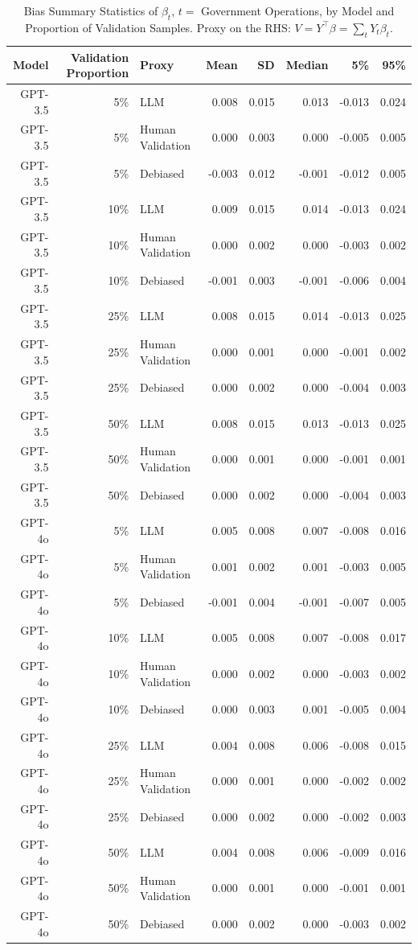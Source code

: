 \begin{table}

\caption{Bias Summary Statistics of $\beta_{t}$, $t=$ Government Operations, by Model and Proportion of Validation Samples.
      Proxy on the RHS: $V = Y^\top \beta = \sum_{t} Y_t \beta_t$.}
\centering
\begin{tabular}[t]{rrlrrrrr}
\toprule
Model & Validation Proportion & Proxy & Mean & SD & Median & 5\% & 95\%\\
\midrule
GPT-3.5 & 5\% & LLM & 0.008 & 0.015 & 0.013 & -0.013 & 0.024\\
GPT-3.5 & 5\% & Human Validation & 0.000 & 0.003 & 0.000 & -0.005 & 0.005\\
GPT-3.5 & 5\% & Debiased & -0.003 & 0.012 & -0.001 & -0.012 & 0.005\\
GPT-3.5 & 10\% & LLM & 0.009 & 0.015 & 0.014 & -0.013 & 0.024\\
GPT-3.5 & 10\% & Human Validation & 0.000 & 0.002 & 0.000 & -0.003 & 0.002\\
GPT-3.5 & 10\% & Debiased & -0.001 & 0.003 & -0.001 & -0.006 & 0.004\\
GPT-3.5 & 25\% & LLM & 0.008 & 0.015 & 0.014 & -0.013 & 0.025\\
GPT-3.5 & 25\% & Human Validation & 0.000 & 0.001 & 0.000 & -0.001 & 0.002\\
GPT-3.5 & 25\% & Debiased & 0.000 & 0.002 & 0.000 & -0.004 & 0.003\\
GPT-3.5 & 50\% & LLM & 0.008 & 0.015 & 0.013 & -0.013 & 0.025\\
GPT-3.5 & 50\% & Human Validation & 0.000 & 0.001 & 0.000 & -0.001 & 0.001\\
GPT-3.5 & 50\% & Debiased & 0.000 & 0.002 & 0.000 & -0.004 & 0.003\\
GPT-4o & 5\% & LLM & 0.005 & 0.008 & 0.007 & -0.008 & 0.016\\
GPT-4o & 5\% & Human Validation & 0.001 & 0.002 & 0.001 & -0.003 & 0.005\\
GPT-4o & 5\% & Debiased & -0.001 & 0.004 & -0.001 & -0.007 & 0.005\\
GPT-4o & 10\% & LLM & 0.005 & 0.008 & 0.007 & -0.008 & 0.017\\
GPT-4o & 10\% & Human Validation & 0.000 & 0.002 & 0.000 & -0.003 & 0.002\\
GPT-4o & 10\% & Debiased & 0.000 & 0.003 & 0.001 & -0.005 & 0.004\\
GPT-4o & 25\% & LLM & 0.004 & 0.008 & 0.006 & -0.008 & 0.015\\
GPT-4o & 25\% & Human Validation & 0.000 & 0.001 & 0.000 & -0.002 & 0.002\\
GPT-4o & 25\% & Debiased & 0.000 & 0.002 & 0.000 & -0.002 & 0.003\\
GPT-4o & 50\% & LLM & 0.004 & 0.008 & 0.006 & -0.009 & 0.016\\
GPT-4o & 50\% & Human Validation & 0.000 & 0.001 & 0.000 & -0.001 & 0.001\\
GPT-4o & 50\% & Debiased & 0.000 & 0.002 & 0.000 & -0.003 & 0.002\\
\bottomrule
\end{tabular}
\end{table}
